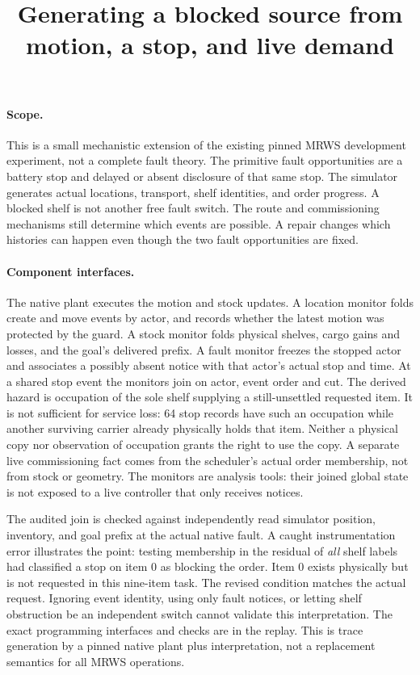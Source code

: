 \documentclass{article}
\title{Generating a blocked source from motion, a stop, and live demand}
\begin{document}
\maketitle
\paragraph{Scope.}
This is a small mechanistic extension of the existing pinned MRWS development experiment, not a complete fault theory. The primitive fault opportunities are a battery stop and delayed or absent disclosure of that same stop. The simulator generates actual locations, transport, shelf identities, and order progress. A blocked shelf is not another free fault switch. The route and commissioning mechanisms still determine which events are possible. A repair changes which histories can happen even though the two fault opportunities are fixed.

\paragraph{Component interfaces.}
The native plant executes the motion and stock updates. A location monitor folds create and move events by actor, and records whether the latest motion was protected by the guard. A stock monitor folds physical shelves, cargo gains and losses, and the goal's delivered prefix. A fault monitor freezes the stopped actor and associates a possibly absent notice with that actor's actual stop and time. At a shared stop event the monitors join on actor, event order and cut. The derived hazard is occupation of the sole shelf supplying a still-unsettled requested item. It is not sufficient for service loss: 64 stop records have such an occupation while another surviving carrier already physically holds that item. Neither a physical copy nor observation of occupation grants the right to use the copy. A separate live commissioning fact comes from the scheduler's actual order membership, not from stock or geometry. The monitors are analysis tools: their joined global state is not exposed to a live controller that only receives notices.

The audited join is checked against independently read simulator position, inventory, and goal prefix at the actual native fault. A caught instrumentation error illustrates the point: testing membership in the residual of \emph{all} shelf labels had classified a stop on item 0 as blocking the order. Item 0 exists physically but is not requested in this nine-item task. The revised condition matches the actual request. Ignoring event identity, using only fault notices, or letting shelf obstruction be an independent switch cannot validate this interpretation. The exact programming interfaces and checks are in the replay. This is trace generation by a pinned native plant plus interpretation, not a replacement semantics for all MRWS operations.
\end{document}
